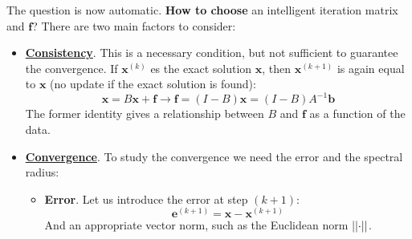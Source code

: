 \highspace
The question is now automatic. \textbf{How to choose} an intelligent iteration matrix and $\mathbf{f}$? There are two main factors to consider:
\begin{itemize}
    \item \textbf{\underline{Consistency}}. This is a necessary condition, but not sufficient to guarantee the convergence. If $\mathbf{x}^{\left(k\right)}$ es the exact solution $\mathbf{x}$, then $\mathbf{x}^{\left(k+1\right)}$ is again equal to $\mathbf{x}$ (no update if the exact solution is found):
    \begin{equation*}
        \mathbf{x} = B \mathbf{x} + \mathbf{f} \longrightarrow \mathbf{f} = \left(I-B\right)\mathbf{x} = \left(I-B\right)A^{-1}\mathbf{b}
    \end{equation*}
    The former identity gives a relationship between $B$ and $\mathbf{f}$ as a function of the data.

    \item \textbf{\underline{Convergence}}. To study the convergence we need the error and the spectral radius:
    \begin{itemize}
        \item \textbf{Error}. Let us introduce the error at step $\left(k+1\right)$:
        \begin{equation*}
            \mathbf{e}^{\left(k+1\right)} = \mathbf{x} - \mathbf{x}^{\left(k+1\right)}
        \end{equation*}
        And an appropriate vector norm, such as the Euclidean norm $\left|\left|\cdot\right|\right|$.
        

\end{itemize}
\end{itemize}
